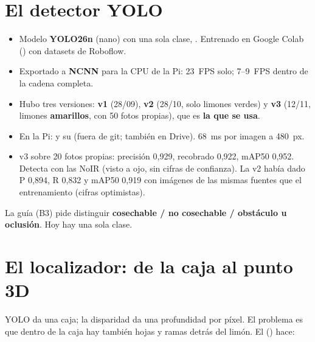 \section{El detector YOLO}

\begin{itemize}
  \item Modelo \textbf{YOLO26n} (nano) con una sola clase, . Entrenado en Google Colab
        () con datasets de Roboflow.
  \item Exportado a \textbf{NCNN} para la CPU de la Pi: 23~FPS solo; 7--9~FPS dentro de la cadena completa.
  \item Hubo tres versiones: \textbf{v1} (28/09), \textbf{v2} (28/10, solo limones verdes) y \textbf{v3} (12/11,
        limones \textbf{amarillos}, con 50 fotos propias), que es \textbf{la que se usa}.
  \item En la Pi:  y su 
        (fuera de git; también en Drive). 68~ms por imagen a 480~px.
  \item v3 sobre 20 fotos propias: precisión 0,929, recobrado 0,922, mAP50 0,952. Detecta con las NoIR (visto a ojo,
        sin cifras de confianza). La v2 había dado P 0,894, R 0,832 y mAP50 0,919 con imágenes de las mismas
        fuentes que el entrenamiento (cifras optimistas).
\end{itemize}

\begin{pendiente}
La guía (B3) pide distinguir \textbf{cosechable / no cosechable / obstáculo u oclusión}. Hoy hay una sola clase.
\end{pendiente}

\section{El localizador: de la caja al punto 3D}

YOLO da una caja; la disparidad da una profundidad por píxel. El problema es que dentro de la caja hay también hojas
y ramas detrás del limón. El  () hace:

